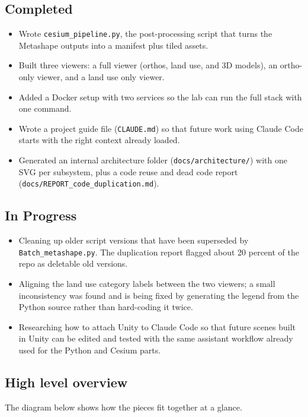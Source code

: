 \documentclass[a4paper,12pt]{article}
\begin{document}
\subsection{Completed}
\begin{itemize}
    \item Wrote \texttt{cesium\_pipeline.py}, the post-processing script that turns the Metashape outputs into a manifest plus tiled assets.
    \item Built three viewers: a full viewer (orthos, land use, and 3D models), an ortho-only viewer, and a land use only viewer.
    \item Added a Docker setup with two services so the lab can run the full stack with one command.
    \item Wrote a project guide file (\texttt{CLAUDE.md}) so that future work using Claude Code starts with the right context already loaded.
    \item Generated an internal architecture folder (\texttt{docs/architecture/}) with one SVG per subsystem, plus a code reuse and dead code report (\texttt{docs/REPORT\_code\_duplication.md}).
\end{itemize}

\subsection{In Progress}
\begin{itemize}
    \item Cleaning up older script versions that have been superseded by \texttt{Batch\_metashape.py}. The duplication report flagged about 20 percent of the repo as deletable old versions.
    \item Aligning the land use category labels between the two viewers; a small inconsistency was found and is being fixed by generating the legend from the Python source rather than hard-coding it twice.
    \item Researching how to attach Unity to Claude Code so that future scenes built in Unity can be edited and tested with the same assistant workflow already used for the Python and Cesium parts.
\end{itemize}

\subsection{High level overview}
The diagram below shows how the pieces fit together at a glance.
\end{document}
